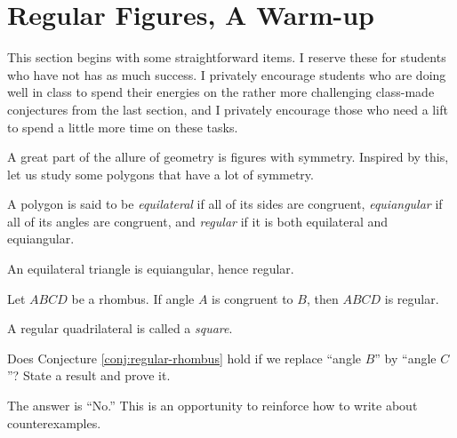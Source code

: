 \chapter{Regular Figures, A Warm-up}

\begin{annotation}
{
\color{blue}
This section begins with some straightforward items. I reserve 
these for students who have not has as much success. I privately encourage students who are doing well in class to spend their energies on the rather more challenging class-made conjectures from the last section, and I privately encourage those who need a lift to spend a little more time on these tasks. 
}
\end{annotation}

A great part of the allure of geometry is figures with symmetry. Inspired by this, let us study some polygons that have a lot of symmetry.

\begin{definition}\label{defn:regular}
A polygon is said to be \emph{equilateral} if all of its sides are congruent, \emph{equiangular} if all of its angles are congruent, and \emph{regular} if it is both equilateral and equiangular.
\end{definition}

\begin{conjecture}\label{conj:equilateral-triangle}
An equilateral triangle is equiangular, hence regular.
\end{conjecture}

\begin{conjecture}\label{conj:regular-rhombus}
Let $ABCD$ be a rhombus. If angle $A$ is congruent to $B$, then $ABCD$ is regular.
\end{conjecture}

\begin{definition}[reminder]\label{defn:square}
A regular quadrilateral is called a \emph{square}.
\end{definition}


\begin{problem}\label{prob:equilateral-quad}
Does Conjecture \ref{conj:regular-rhombus} hold if we replace ``angle $B$'' by ``angle $C$''? State a result and prove it.
\end{problem}

\begin{annotation}
{
\color{blue}
The answer is ``No.'' This is an opportunity to reinforce how to write about counterexamples. 
}
\end{annotation}

